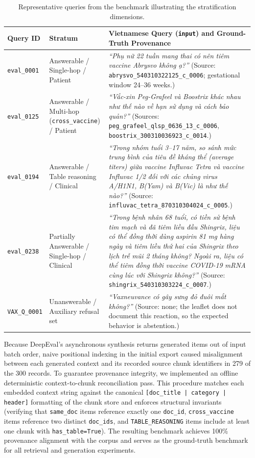 \documentclass[sn-mathphys, oneside]{sn-jnl}
\newcommand{\vn}[1]{{\fontencoding{T5}\selectfont #1}}
\newcommand{\artifact}[1]{\nolinkurl{#1}}
\begin{document}
\begin{table}[htbp]
\centering
\caption{Representative queries from the benchmark illustrating the stratification dimensions.}
\label{tab:benchmark_examples}
\begin{tabularx}{\linewidth}{llX}
\toprule
Query ID & Stratum & Vietnamese Query (\artifact{input}) and Ground-Truth Provenance\\
\midrule
\artifact{eval\_0001} & Answerable / Single-hop / Patient & \emph{\vn{``Phụ nữ 22 tuần mang thai có nên tiêm vaccine Abrysvo không ạ?''}} (Source: \artifact{abrysvo\_540310322125\_c\_0006}; gestational window 24--36 weeks.)\\
\artifact{eval\_0125} & Answerable / Multi-hop (\artifact{cross\_vaccine}) / Patient & \emph{\vn{``Vắc-xin Peg-Grafeel và Boostrix khác nhau như thế nào về hạn sử dụng và cách bảo quản?''}} (Sources: \artifact{peg\_grafeel\_qlsp\_0636\_13\_c\_0006}, \artifact{boostrix\_300310036923\_c\_0014}.)\\
\artifact{eval\_0194} & Answerable / Table reasoning / Clinical & \emph{\vn{``Trong nhóm tuổi 3--17 năm, so sánh mức trung bình của tiêu đề kháng thể (average titers) giữa vaccine Influvac Tetra và vaccine Influvac 1/2 đối với các chủng virus A/H1N1, B(Yam) và B(Vic) là như thế nào?''}} (Source: \artifact{influvac\_tetra\_870310304024\_c\_0005}.)\\
\artifact{eval\_0238} & Partially Answerable / Single-hop / Clinical & \emph{\vn{``Trong bệnh nhân 68 tuổi, có tiền sử bệnh tim mạch và đã tiêm liều đầu Shingrix, liệu có thể đồng thời dùng aspirin 81 mg hàng ngày và tiêm liều thứ hai của Shingrix theo lịch trễ mũi 2 tháng không? Ngoài ra, liệu có thể tiêm đồng thời vaccine COVID-19 mRNA cùng lúc với Shingrix không?''}} (Source: \artifact{shingrix\_540310303224\_c\_0007}.)\\
\artifact{VAX\_Q\_0001} & Unanswerable / Auxiliary refusal set & \emph{\vn{``Vaxneuvance có gây sưng đỏ đuôi mắt không?''}} (Source: none; the leaflet does not document this reaction, so the expected behavior is abstention.)\\
\bottomrule
\end{tabularx}
\end{table}

Because DeepEval's asynchronous synthesis returns generated items out of input batch order, naive positional indexing in the initial export caused misalignment between each generated context and its recorded source chunk identifiers in 279 of the 300 records. To guarantee provenance integrity, we implemented an offline deterministic context-to-chunk reconciliation pass. This procedure matches each embedded context string against the canonical \texttt{[doc\_title | category | header]} formatting of the chunk store and enforces structural invariants (verifying that \artifact{same_doc} items reference exactly one \artifact{doc_id}, \artifact{cross_vaccine} items reference two distinct \artifact{doc_ids}, and \artifact{TABLE_REASONING} items include at least one chunk with \artifact{has_table=True}). The resulting benchmark achieves 100\% provenance alignment with the corpus and serves as the ground-truth benchmark for all retrieval and generation experiments.
\end{document}
